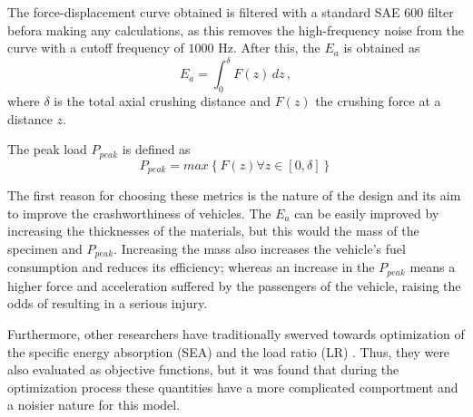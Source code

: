 \documentclass[cmfonts]{witpress}
\begin{document}
The force-displacement curve obtained is filtered with a standard SAE 600 filter \cite{J211} befora making any calculations, as this removes the high-frequency noise from the curve with a cutoff frequency of ${1000}$ Hz. After this, the $E_a$ is obtained as
\begin{equation}\label{Ea}
  E_{a}=\int _{0}^{\delta }F\! \left( z \right) \,dz\,,
\end{equation}
where $\delta$ is the total axial crushing distance and $F\! \left( z \right)$ the crushing force at a distance $z$.

The peak load $P_{peak}$ is defined as
\begin{equation}\label{Peak}
 P_{peak}=max\left\{ F\! \left( z \right)  \forall z \in [0,\delta] \right\}
\end{equation}

The first reason for choosing these metrics is the nature of the design and its aim to improve the crashworthiness of vehicles. The $E_a$ can be easily improved by increasing the thicknesses of the materials, but this would the mass of the specimen and $P_{peak}$. Increasing the mass also  increases the vehicle's fuel consumption and reduces its efficiency; whereas an increase in the $P_{peak}$ means a higher force and acceleration suffered by the passengers of the vehicle, raising the odds of resulting in a serious injury.

Furthermore, other researchers have traditionally swerved towards optimization of the specific energy absorption (SEA) and the load ratio (LR) \cite{Hou2007555}. Thus, they were also evaluated as objective functions, but it was found that during the optimization process these quantities have a more complicated comportment and a noisier nature for this model. 


\end{document}
